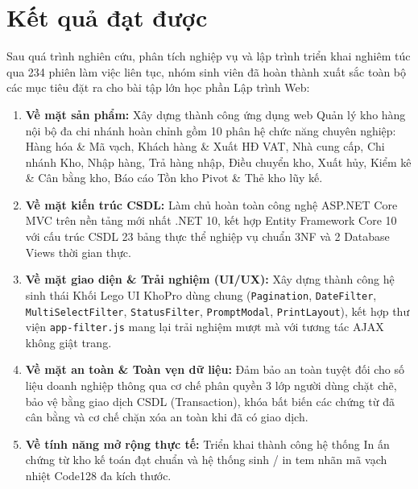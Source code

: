 \documentclass[12pt,a4paper]{report}
\renewcommand{\_}{\textunderscore\allowbreak}
\begin{document}
\section{Kết quả đạt được}
Sau quá trình nghiên cứu, phân tích nghiệp vụ và lập trình triển khai nghiêm túc qua 234 phiên làm việc liên tục, nhóm sinh viên đã hoàn thành xuất sắc toàn bộ các mục tiêu đặt ra cho bài tập lớn học phần Lập trình Web:
\begin{enumerate}
    \item \textbf{Về mặt sản phẩm:} Xây dựng thành công ứng dụng web Quản lý kho hàng nội bộ đa chi nhánh hoàn chỉnh gồm 10 phân hệ chức năng chuyên nghiệp: Hàng hóa \& Mã vạch, Khách hàng \& Xuất HĐ VAT, Nhà cung cấp, Chi nhánh Kho, Nhập hàng, Trả hàng nhập, Điều chuyển kho, Xuất hủy, Kiểm kê \& Cân bằng kho, Báo cáo Tồn kho Pivot \& Thẻ kho lũy kế.
    \item \textbf{Về mặt kiến trúc CSDL:} Làm chủ hoàn toàn công nghệ ASP.NET Core MVC trên nền tảng mới nhất .NET 10, kết hợp Entity Framework Core 10 với cấu trúc CSDL 23 bảng thực thể nghiệp vụ chuẩn 3NF và 2 Database Views thời gian thực.
    \item \textbf{Về mặt giao diện \& Trải nghiệm (UI/UX):} Xây dựng thành công hệ sinh thái Khối Lego UI KhoPro dùng chung (\texttt{\_Pagination}, \texttt{\_DateFilter}, \texttt{\_MultiSelectFilter}, \texttt{\_StatusFilter}, \texttt{\_PromptModal}, \texttt{\_PrintLayout}), kết hợp thư viện \texttt{app-filter.js} mang lại trải nghiệm mượt mà với tương tác AJAX không giật trang.
    \item \textbf{Về mặt an toàn \& Toàn vẹn dữ liệu:} Đảm bảo an toàn tuyệt đối cho số liệu doanh nghiệp thông qua cơ chế phân quyền 3 lớp người dùng chặt chẽ, bảo vệ bằng giao dịch CSDL (Transaction), khóa bất biến các chứng từ đã cân bằng và cơ chế chặn xóa an toàn khi đã có giao dịch.
    \item \textbf{Về tính năng mở rộng thực tế:} Triển khai thành công hệ thống In ấn chứng từ kho kế toán đạt chuẩn và hệ thống sinh / in tem nhãn mã vạch nhiệt Code128 đa kích thước.
\end{enumerate}
\end{document}
